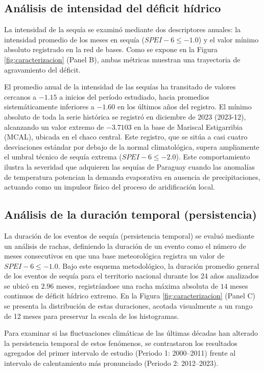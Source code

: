 \subsection{Análisis de intensidad del déficit hídrico}

La intensidad de la sequía se examinó mediante dos descriptores anuales: la intensidad promedio de los meses en sequía ($SPEI-6 \leq -1.0$) y el valor mínimo absoluto registrado en la red de bases. Como se expone en la Figura \ref{fig:caracterizacion} (Panel B), ambas métricas muestran una trayectoria de agravamiento del déficit.

El promedio anual de la intensidad de las sequías ha transitado de valores cercanos a $-1.15$ a inicios del período estudiado, hacia promedios sistemáticamente inferiores a $-1.60$ en los últimos años del registro. El mínimo absoluto de toda la serie histórica se registró en diciembre de 2023 (2023-12), alcanzando un valor extremo de $-3.7103$ en la base de Mariscal Estigarribia (MCAL), ubicada en el chaco central. Este registro, que se sitúa a casi cuatro desviaciones estándar por debajo de la normal climatológica, supera ampliamente el umbral técnico de sequía extrema ($SPEI-6 \leq -2.0$). Este comportamiento ilustra la severidad que adquieren las sequías de Paraguay cuando las anomalías de temperatura potencian la demanda evaporativa en ausencia de precipitaciones, actuando como un impulsor físico del proceso de aridificación local.

\subsection{Análisis de la duración temporal (persistencia)}

La duración de los eventos de sequía (persistencia temporal) se evaluó mediante un análisis de rachas, definiendo la duración de un evento como el número de meses consecutivos en que una base meteorológica registra un valor de $SPEI-6 \leq -1.0$. Bajo este esquema metodológico, la duración promedio general de los eventos de sequía para el territorio nacional durante los 24 años analizados se ubicó en $2.96$ meses, registrándose una racha máxima absoluta de $14$ meses continuos de déficit hídrico extremo. En la Figura \ref{fig:caracterizacion} (Panel C) se presenta la distribución de estas duraciones, acotada visualmente a un rango de 12 meses para preservar la escala de los histogramas.

Para examinar si las fluctuaciones climáticas de las últimas décadas han alterado la persistencia temporal de estos fenómenos, se contrastaron los resultados agregados del primer intervalo de estudio (Periodo 1: 2000--2011) frente al intervalo de calentamiento más pronunciado (Periodo 2: 2012--2023). 

